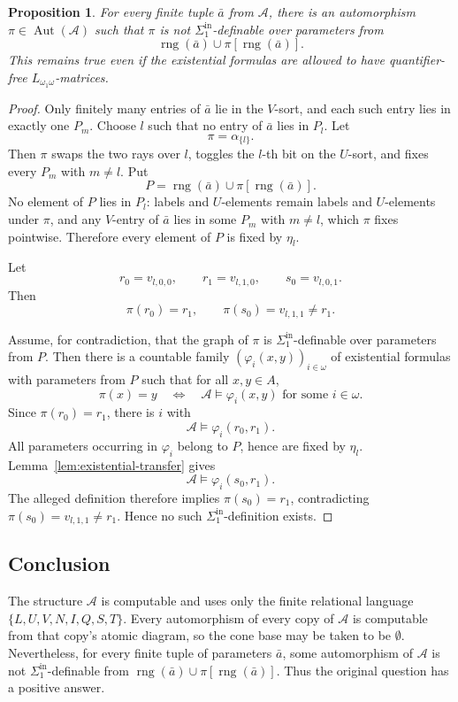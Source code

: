 \documentclass[12pt]{article}
\newtheorem{proposition}[theorem]{Proposition}
\theoremstyle{definition}
\theoremstyle{remark}
\newcommand{\Aut}{\operatorname{Aut}}
\newcommand{\rng}{\operatorname{rng}}
\begin{document}
\begin{proposition}\label{prop:nondef}
For every finite tuple \(\bar a\) from \(\mathcal A\), there is an automorphism \(\pi\in\Aut(\mathcal A)\) such that \(\pi\) is not \(\Sigma^{\mathrm{in}}_1\)-definable over parameters from
\[
\rng(\bar a)\cup \pi[\rng(\bar a)].
\]
This remains true even if the existential formulas are allowed to have quantifier-free \(L_{\omega_1\omega}\)-matrices.
\end{proposition}

\begin{proof}
Only finitely many entries of \(\bar a\) lie in the \(V\)-sort, and each such entry lies in exactly one \(P_m\).  Choose \(l\) such that no entry of \(\bar a\) lies in \(P_l\).  Let
\[
\pi=\alpha_{\{l\}}.
\]
Then \(\pi\) swaps the two rays over \(l\), toggles the \(l\)-th bit on the \(U\)-sort, and fixes every \(P_m\) with \(m\neq l\).  Put
\[
P=\rng(\bar a)\cup \pi[\rng(\bar a)].
\]
No element of \(P\) lies in \(P_l\): labels and \(U\)-elements remain labels and \(U\)-elements under \(\pi\), and any \(V\)-entry of \(\bar a\) lies in some \(P_m\) with \(m\neq l\), which \(\pi\) fixes pointwise.  Therefore every element of \(P\) is fixed by \(\eta_l\).

Let
\[
r_0=v_{l,0,0},\qquad r_1=v_{l,1,0},\qquad s_0=v_{l,0,1}.
\]
Then
\[
\pi(r_0)=r_1,
\qquad
\pi(s_0)=v_{l,1,1}\neq r_1.
\]

Assume, for contradiction, that the graph of \(\pi\) is \(\Sigma^{\mathrm{in}}_1\)-definable over parameters from \(P\).  Then there is a countable family \((\varphi_i(x,y))_{i\in\omega}\) of existential formulas with parameters from \(P\) such that for all \(x,y\in A\),
\[
\pi(x)=y
\quad\Longleftrightarrow\quad
\mathcal A\models\varphi_i(x,y)\text{ for some }i\in\omega.
\]
Since \(\pi(r_0)=r_1\), there is \(i\) with
\[
\mathcal A\models\varphi_i(r_0,r_1).
\]
All parameters occurring in \(\varphi_i\) belong to \(P\), hence are fixed by \(\eta_l\).  Lemma~\ref{lem:existential-transfer} gives
\[
\mathcal A\models\varphi_i(s_0,r_1).
\]
The alleged definition therefore implies \(\pi(s_0)=r_1\), contradicting \(\pi(s_0)=v_{l,1,1}\neq r_1\).  Hence no such \(\Sigma^{\mathrm{in}}_1\)-definition exists.
\end{proof}

\subsection*{Conclusion}

The structure \(\mathcal A\) is computable and uses only the finite relational language \(\{L,U,V,N,I,Q,S,T\}\).  Every automorphism of every copy of \(\mathcal A\) is computable from that copy's atomic diagram, so the cone base may be taken to be \(\emptyset\).  Nevertheless, for every finite tuple of parameters \(\bar a\), some automorphism of \(\mathcal A\) is not \(\Sigma^{\mathrm{in}}_1\)-definable from \(\rng(\bar a)\cup\pi[\rng(\bar a)]\).  Thus the original question has a positive answer.
\end{document}
